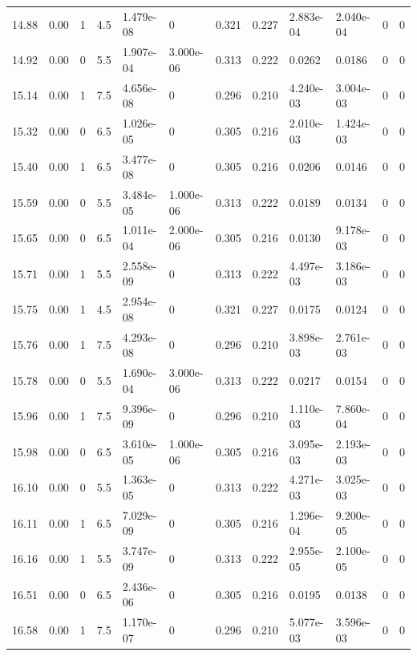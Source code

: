 \documentclass[preview]{standalone}
\begin{document}
{{{{{\begin{tabular}{L{1.2cm}C{1.2cm} C{0.3cm}C{0.5cm} C{1.4cm}C{1.4cm} C{1.4cm}C{1.4cm} C{1.6cm}C{1.6cm} C{1.6cm}C{1.6cm}}
  14.88  &  0.00  & 1     & 4.5 &  1.479e-08  & 0  &  0.321&   0.227& 2.883e-04 & 2.040e-04   &  0 & 0  \\ 
  14.92  &  0.00  & 0     & 5.5 &  1.907e-04  & 3.000e-06  &  0.313&   0.222& 0.0262 & 0.0186   &  0 & 0  \\ 
  15.14  &  0.00  & 1     & 7.5 &  4.656e-08  & 0  &  0.296&   0.210& 4.240e-03 & 3.004e-03   &  0 & 0  \\ 
  15.32  &  0.00  & 0     & 6.5 &  1.026e-05  & 0  &  0.305&   0.216& 2.010e-03 & 1.424e-03   &  0 & 0  \\ 
  15.40  &  0.00  & 1     & 6.5 &  3.477e-08  & 0  &  0.305&   0.216& 0.0206 & 0.0146   &  0 & 0  \\ 
  15.59  &  0.00  & 0     & 5.5 &  3.484e-05  & 1.000e-06  &  0.313&   0.222& 0.0189 & 0.0134   &  0 & 0  \\ 
  15.65  &  0.00  & 0     & 6.5 &  1.011e-04  & 2.000e-06  &  0.305&   0.216& 0.0130 & 9.178e-03   &  0 & 0  \\ 
  15.71  &  0.00  & 1     & 5.5 &  2.558e-09  & 0  &  0.313&   0.222& 4.497e-03 & 3.186e-03   &  0 & 0  \\ 
  15.75  &  0.00  & 1     & 4.5 &  2.954e-08  & 0  &  0.321&   0.227& 0.0175 & 0.0124   &  0 & 0  \\ 
  15.76  &  0.00  & 1     & 7.5 &  4.293e-08  & 0  &  0.296&   0.210& 3.898e-03 & 2.761e-03   &  0 & 0  \\ 
  15.78  &  0.00  & 0     & 5.5 &  1.690e-04  & 3.000e-06  &  0.313&   0.222& 0.0217 & 0.0154   &  0 & 0  \\ 
  15.96  &  0.00  & 1     & 7.5 &  9.396e-09  & 0  &  0.296&   0.210& 1.110e-03 & 7.860e-04   &  0 & 0  \\ 
  15.98  &  0.00  & 0     & 6.5 &  3.610e-05  & 1.000e-06  &  0.305&   0.216& 3.095e-03 & 2.193e-03   &  0 & 0  \\ 
  16.10  &  0.00  & 0     & 5.5 &  1.363e-05  & 0  &  0.313&   0.222& 4.271e-03 & 3.025e-03   &  0 & 0  \\ 
  16.11  &  0.00  & 1     & 6.5 &  7.029e-09  & 0  &  0.305&   0.216& 1.296e-04 & 9.200e-05   &  0 & 0  \\ 
  16.16  &  0.00  & 1     & 5.5 &  3.747e-09  & 0  &  0.313&   0.222& 2.955e-05 & 2.100e-05   &  0 & 0  \\ 
  16.51  &  0.00  & 0     & 6.5 &  2.436e-06  & 0  &  0.305&   0.216& 0.0195 & 0.0138   &  0 & 0  \\ 
  16.58  &  0.00  & 1     & 7.5 &  1.170e-07  & 0  &  0.296&   0.210& 5.077e-03 & 3.596e-03   &  0 & 0  \\ 

\end{tabular}}}}}}
\end{document}
